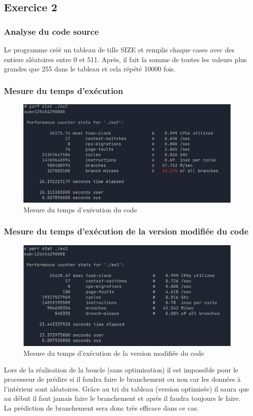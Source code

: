 \documentclass{ReportTemplate}
\begin{document}
\subsection{Exercice 2}
\subsubsection{Analyse du code source}
Le programme créé un tableau de tille SIZE et remplis chaque cases avec des
entiers aléatoires entre  0 et 511. Après, il fait la somme de toutes les
valeurs plus grandes que 255 dans le tableau et cela répété 10000 fois.
\subsubsection{Mesure du temps d'exécution}
\begin{figure}[H]
    \centering
    \includegraphics[width=\textwidth]{imageSources/Ex2_ExecTime1.png}
    \caption{Mesure du temps d'exécution du code}
    \label{fig:ExecTime1}
\end{figure}
\subsubsection{Mesure du temps d'exécution de la version modifiée du code}
\begin{figure}[H]
    \centering
    \includegraphics[width=\textwidth]{imageSources/Ex2_ExecTime2.png}
    \caption{Mesure du temps d'exécution de la version modifiée du code}
    \label{fig:ExecTime2}
\end{figure}
Lors de la réalisation de la boucle (sans optimisation) il est impossible pour
le processeur de prédire si il faudra faire le branchement ou non car les
données à l'intérieur sont aléatoires. Grâce au tri du tableau (version
optimisée) il saura que au début il faut jamais faire le branchement et après il
faudra toujours le faire. La prédiction de branchement sera donc très efficace
dans ce cas.
\end{document}

